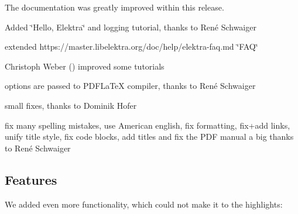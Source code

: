 The documentation was greatly improved within this release.


\begin{DoxyItemize}
\item Added \char`\"{}\+Hello, Elektra\char`\"{} and logging tutorial, thanks to René Schwaiger
\item extended https\+://master.libelektra.\+org/doc/help/elektra-\/faq.md \char`\"{}\+F\+A\+Q\char`\"{}
\item Christoph Weber () improved some tutorials
\item options are passed to P\+D\+F\+La\+TeX compiler, thanks to René Schwaiger
\item small fixes, thanks to Dominik Hofer
\item fix many spelling mistakes, use American english, fix formatting, fix+add links, unify title style, fix code blocks, add titles and fix the P\+DF manual a big thanks to René Schwaiger
\end{DoxyItemize}

\subsection*{Features}

We added even more functionality, which could not make it to the highlights\+:


